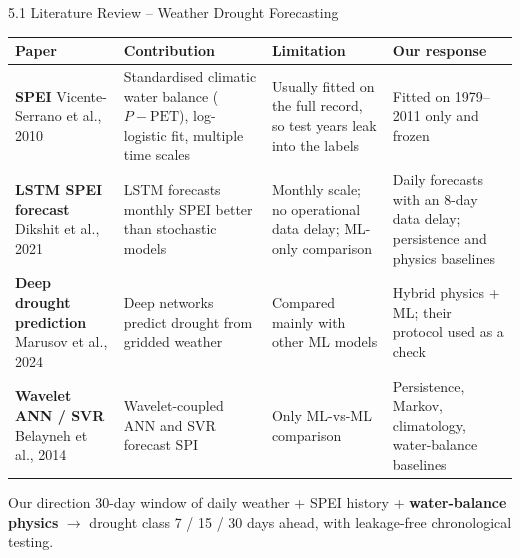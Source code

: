 \documentclass[aspectratio=169,10pt]{beamer}
\begin{document}
\begin{frame}{5.1 Literature Review -- Weather Drought Forecasting}
\footnotesize
\renewcommand{\arraystretch}{1.45}
\begin{tabularx}{\textwidth}{@{}p{3.3cm}YYY@{}}
\toprule
\textbf{Paper} & \textbf{Contribution} & \textbf{Limitation} & \textbf{Our response} \\ \midrule
\textbf{SPEI} \newline Vicente-Serrano et al., 2010 & Standardised climatic water balance ($P - \mathrm{PET}$), log-logistic fit, multiple time scales & Usually fitted on the full record, so test years leak into the labels & Fitted on 1979--2011 only and frozen \\
\textbf{LSTM SPEI forecast} \newline Dikshit et al., 2021 & LSTM forecasts monthly SPEI better than stochastic models & Monthly scale; no operational data delay; ML-only comparison & Daily forecasts with an 8-day data delay; persistence and physics baselines \\
\textbf{Deep drought prediction} \newline Marusov et al., 2024 & Deep networks predict drought from gridded weather & Compared mainly with other ML models & Hybrid physics + ML; their protocol used as a check \\
\textbf{Wavelet ANN / SVR} \newline Belayneh et al., 2014 & Wavelet-coupled ANN and SVR forecast SPI & Only ML-vs-ML comparison & Persistence, Markov, climatology, water-balance baselines \\
\bottomrule
\end{tabularx}
\begin{block}{Our direction}
\footnotesize 30-day window of daily weather + SPEI history + \textbf{water-balance physics} $\rightarrow$ drought class 7 / 15 / 30 days ahead, with leakage-free chronological testing.
\end{block}
\end{frame}
\end{document}
